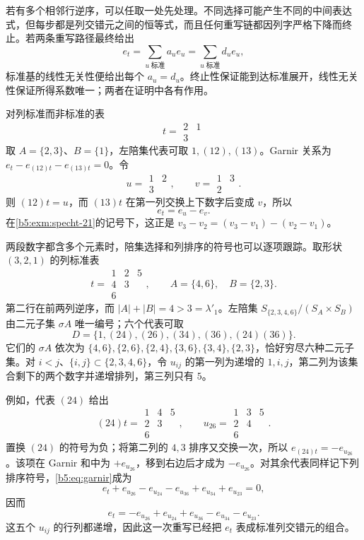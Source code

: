 \ProseParagraphBreak
若有多个相邻行逆序，可以任取一处先处理。不同选择可能产生不同的中间表达式，但每步都是列交错元之间的恒等式，而且任何重写链都因列字严格下降而终止。若两条重写路径最终给出
\[
	e_t=\sum_{u\;\text{标准}}a_ue_u =\sum_{u\;\text{标准}}d_ue_u,
\]
标准基的线性无关性便给出每个 \(a_u=d_u\)。终止性保证能到达标准展开，线性无关性保证所得系数唯一；两者在证明中各有作用。

\begin{example}\label{b5:exm:garnir-21}
	对列标准而非标准的表
	\[
		t=\begin{array}{cc}2&1\\3&\end{array}
	\]
	取 \(A=\{2,3\}\)、\(B=\{1\}\)，左陪集代表可取 \(1,(12),(13)\)。Garnir 关系为 \(e_t-e_{(12)t}-e_{(13)t}=0\)。令
	\[
		u=\begin{array}{cc}1&2\\3&\end{array},
		\qquad
		v=\begin{array}{cc}1&3\\2&\end{array}.
	\]
	则 \((12)t=u\)，而 \((13)t\) 在第一列交换上下数字后变成 \(v\)，所以
	\[
		e_t=e_u-e_v.
	\]
	在\cref{b5:exm:specht-21}的记号下，这正是 \(v_3-v_2=(v_3-v_1)-(v_2-v_1)\)。
\end{example}

两段数字都含多个元素时，陪集选择和列排序的符号也可以逐项跟踪。取形状 \((3,2,1)\) 的列标准表
\[
	t=\begin{array}{ccc}1&2&5\\4&3&\\6&&\end{array},
	\qquad A=\{4,6\},\quad B=\{2,3\}.
\]
第二行在前两列逆序，而 \(|A|+|B|=4>3=\lambda'_1\)。左陪集 \(S_{\{2,3,4,6\}}/(S_A\times S_B)\) 由二元子集 \(\sigma A\) 唯一编号；六个代表可取
\[
	D=\{1,(24),(26),(34),(36),(24)(36)\}.
\]
它们的 \(\sigma A\) 依次为 \(\{4,6\},\{2,6\},\{2,4\},\{3,6\},\{3,4\},\{2,3\}\)，恰好穷尽六种二元子集。对 \(i<j\)、\(\{i,j\}\subset\{2,3,4,6\}\)，令 \(u_{ij}\) 的第一列为递增的 \(1,i,j\)，第二列为该集合剩下的两个数字并递增排列，第三列只有 \(5\)。

\ProseParagraphBreak
例如，代表 \((24)\) 给出
\[
	(24)t=\begin{array}{ccc}1&4&5\\2&3&\\6&&\end{array},
	\qquad
	u_{26}=\begin{array}{ccc}1&3&5\\2&4&\\6&&\end{array}.
\]
置换 \((24)\) 的符号为负；将第二列的 \(4,3\) 排序又交换一次，所以 \(e_{(24)t}=-e_{u_{26}}\)。该项在 Garnir 和中为 \(+e_{u_{26}}\)，移到右边后才成为 \(-e_{u_{26}}\)。对其余代表同样记下列排序符号，\eqref{b5:eq:garnir}成为
\[
	e_t+e_{u_{26}}-e_{u_{24}}-e_{u_{36}} +e_{u_{34}}+e_{u_{23}}=0,
\]
因而
\[
	e_t=-e_{u_{26}}+e_{u_{24}}+e_{u_{36}} -e_{u_{34}}-e_{u_{23}}.
\]
这五个 \(u_{ij}\) 的行列都递增，因此这一次重写已经把 \(e_t\) 表成标准列交错元的组合。

